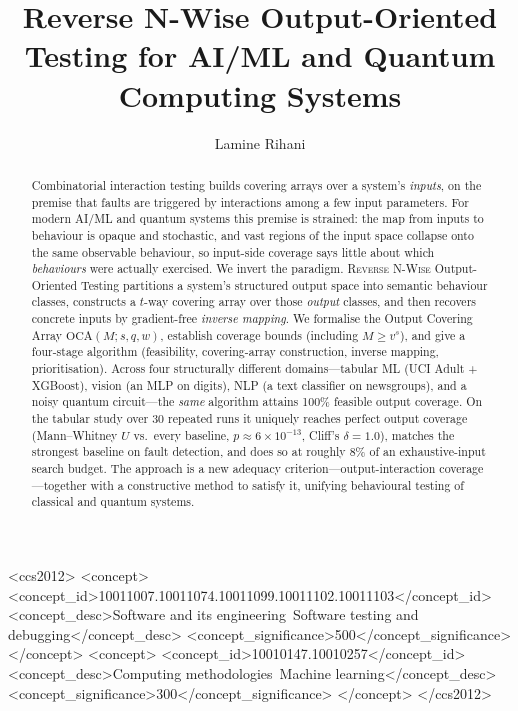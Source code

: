 \documentclass[sigconf]{acmart}
\theoremstyle{definition}
\theoremstyle{plain}
\newcommand{\OCA}{\ensuremath{\mathrm{OCA}}}
\newcommand{\rnwise}{\textsc{Reverse N-Wise}}
\begin{document}
\title{Reverse N-Wise Output-Oriented Testing for AI/ML and Quantum Computing
Systems}

\author{Lamine Rihani}

\renewcommand{\shortauthors}{Rihani}

\begin{abstract}
Combinatorial interaction testing builds covering arrays over a system's
\emph{inputs}, on the premise that faults are triggered by interactions among a
few input parameters. For modern AI/ML and quantum systems this premise is
strained: the map from inputs to behaviour is opaque and stochastic, and vast
regions of the input space collapse onto the same observable behaviour, so
input-side coverage says little about which \emph{behaviours} were actually
exercised. We invert the paradigm. \rnwise{} Output-Oriented Testing partitions a
system's structured output space into semantic behaviour classes, constructs a
$t$-way covering array over those \emph{output} classes, and then recovers
concrete inputs by gradient-free \emph{inverse mapping}. We formalise the
Output Covering Array $\OCA(M;s,q,w)$, establish coverage bounds
(including $M \ge v^{s}$), and give a four-stage algorithm
(feasibility, covering-array construction, inverse mapping, prioritisation).
Across four structurally different domains---tabular ML (UCI Adult + XGBoost),
vision (an MLP on digits), NLP (a text classifier on newsgroups), and a noisy
quantum circuit---the \emph{same} algorithm attains 100\% feasible output
coverage. On the tabular study over 30 repeated runs it uniquely reaches perfect
output coverage (Mann--Whitney $U$ vs.\ every baseline, $p \approx 6\times
10^{-13}$, Cliff's $\delta = 1.0$), matches the strongest baseline on fault
detection, and does so at roughly $8\%$ of an exhaustive-input search budget.
The approach is a new adequacy criterion---output-interaction coverage---together
with a constructive method to satisfy it, unifying behavioural testing of
classical and quantum systems.
\end{abstract}

\begin{CCSXML}
<ccs2012>
<concept>
<concept_id>10011007.10011074.10011099.10011102.10011103</concept_id>
<concept_desc>Software and its engineering~Software testing and debugging</concept_desc>
<concept_significance>500</concept_significance>
</concept>
<concept>
<concept_id>10010147.10010257</concept_id>
<concept_desc>Computing methodologies~Machine learning</concept_desc>
<concept_significance>300</concept_significance>
</concept>
</ccs2012>
\end{CCSXML}
\end{document}
